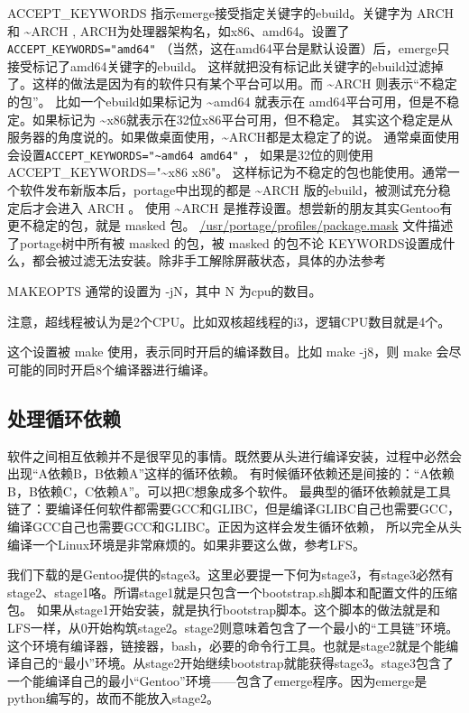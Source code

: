 ACCEPT\_KEYWORDS%
指示emerge接受指定关键字的ebuild。关键字为 ARCH 和 \textasciitilde{}ARCH , ARCH为处理器架构名，如x86、amd64。设置了{\tt ACCEPT\_KEYWORDS="amd64"} （当然，这在amd64平台是默认设置）后，emerge只接受标记了amd64关键字的ebuild。
这样就把没有标记此关键字的ebuild过滤掉了。这样的做法是因为有的软件只有某个平台可以用。而 \textasciitilde{}ARCH 则表示“不稳定的包”。
比如一个ebuild如果标记为 \textasciitilde{}amd64 就表示在 amd64平台可用，但是不稳定。如果标记为 \textasciitilde{}x86就表示在32位x86平台可用，但不稳定。
其实这个稳定是从服务器的角度说的。如果做桌面使用，\textasciitilde{}ARCH都是太稳定了的说。
通常桌面使用会设置{\tt ACCEPT\_KEYWORDS="\textasciitilde{}amd64 amd64"} ， 如果是32位的则使用ACCEPT\_KEYWORDS="\textasciitilde{}x86 x86"。 这样标记为不稳定的包也能使用。通常一个软件发布新版本后，portage中出现的都是 \textasciitilde{}ARCH 版的ebuild，被测试充分稳定后才会进入 ARCH 。
使用 \textasciitilde{}ARCH 是推荐设置。想尝新的朋友其实Gentoo有更不稳定的包，就是 masked 包。
\url{/usr/portage/profiles/package.mask} 文件描述了portage树中所有被 masked 的包，被 masked 的包不论 KEYWORDS设置成什么，都会被过滤无法安装。除非手工解除屏蔽状态，具体的办法参考 

MAKEOPTS%
通常的设置为 -jN，其中 N 为cpu的数目。\begin{notice}
注意，超线程被认为是2个CPU。比如双核超线程的i3，逻辑CPU数目就是4个。
\end{notice} 这个设置被 make 使用，表示同时开启的编译数目。比如 make -j8，则 make 会尽可能的同时开启8个编译器进行编译。


\subsection*{处理循环依赖}
软件之间相互依赖并不是很罕见的事情。既然要从头进行编译安装，过程中必然会出现“A依赖B，B依赖A”这样的循环依赖。
有时候循环依赖还是间接的：“A依赖B，B依赖C，C依赖A”。可以把C想象成多个软件。
最典型的循环依赖就是工具链了：要编译任何软件都需要GCC和GLIBC，但是编译GLIBC自己也需要GCC，编译GCC自己也需要GCC和GLIBC。正因为这样会发生循环依赖，
所以完全从头编译一个Linux环境是非常麻烦的。如果非要这么做，参考LFS。

我们下载的是Gentoo提供的stage3。这里必要提一下何为stage3，有stage3必然有stage2、stage1咯。所谓stage1就是只包含一个bootstrap.sh脚本和配置文件的压缩包。
如果从stage1开始安装，就是执行bootstrap脚本。这个脚本的做法就是和LFS一样，从0开始构筑stage2。stage2则意味着包含了一个最小的“工具链”环境。
这个环境有编译器，链接器，bash，必要的命令行工具。也就是stage2就是个能编译自己的“最小”环境。从stage2开始继续bootstrap就能获得stage3。stage3包含了一个能编译自己的最小“Gentoo”环境——包含了emerge程序。因为emerge是python编写的，故而不能放入stage2。


